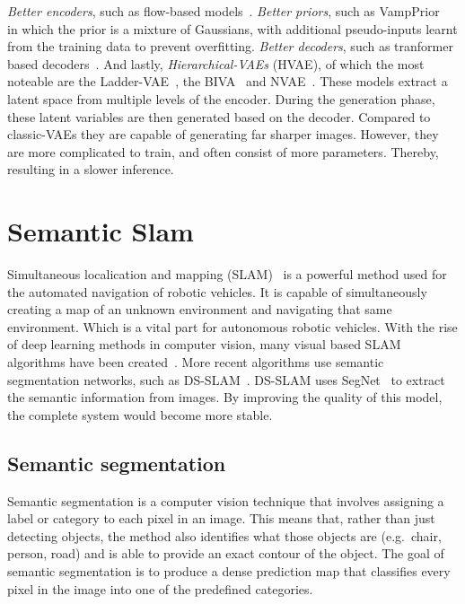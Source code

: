 \emph{Better encoders}, such as flow-based models~\cite{Berg2018SylvesterNF,tomczak2017improving,rezende2015variational}. \emph{Better priors}, such as VampPrior~\cite{tomczak2018vae} in which the prior is a mixture of Gaussians, with additional pseudo-inputs learnt from the training data to prevent overfitting. \emph{Better decoders}, such as tranformer based decoders~\cite{Henderson2022AVA,9054554}. And lastly, \emph{Hierarchical-VAEs} (HVAE), of which the most noteable are the Ladder-VAE~\cite{NIPS2016_6ae07dcb}, the BIVA~\cite{maaloe2019biva} and NVAE~\cite{vahdat2020nvae}. These models extract a latent space from multiple levels of the encoder. During the generation phase, these latent variables are then generated based on the decoder. Compared to classic-VAEs they are capable of generating far sharper images. However, they are more complicated to train, and often consist of more parameters. Thereby, resulting in a slower inference.


\section{Semantic Slam}
Simultaneous localication and mapping (SLAM)~\cite{chatila1985position} is a powerful method used for the automated navigation of robotic vehicles. It is capable of simultaneously creating a map of an unknown environment and navigating that same environment. Which is a vital part for autonomous robotic vehicles. With the rise of deep learning methods in computer vision, many visual based SLAM algorithms have been created~\cite{taketomi2017visual}. More recent algorithms use semantic segmentation networks, such as DS-SLAM~\cite{yu2018ds}. DS-SLAM uses SegNet~\cite{badri2017segnet} to extract the semantic information from images. By improving the quality of this model, the complete system would become more stable.

\subsection{Semantic segmentation}
Semantic segmentation is a computer vision technique that involves assigning a label or category to each pixel in an image. This means that, rather than just detecting objects, the method also identifies what those objects are (e.g.\, chair, person, road) and is able to provide an exact contour of the object. The goal of semantic segmentation is to produce a dense prediction map that classifies every pixel in the image into one of the predefined categories.

